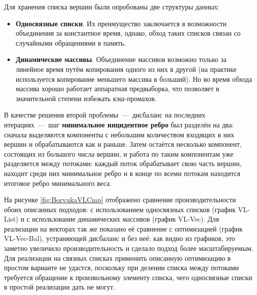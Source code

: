 \documentclass[a4paper,10pt]{extarticle}
\begin{document}
Для хранения списка вершин были опробованы две структуры данных:
\begin{itemize}
	\item \textbf{Односвязные списки}. Их преимущество заключается в возможности объединения за константное время, однако, обход таких списков связан со случайными обращениями в память.
	\item \textbf{Динамические массивы}. Объединение массивов возможно только за линейное время путём копирования одного из них в другой (на практике используется копирование меньшего массива в больший). Но во время обхода массива хорошо работает аппаратная предвыборка, что позволяет в значительной степени избежать кэш-промахов.
\end{itemize}

В качестве решения второй проблемы~---~дисбаланс на последних итерациях~---~шаг \textbf{минимальное инцидентное ребро} был разделён на два: сначала выделяются компоненты с небольшим количеством входящих в них вершин и обрабатываются как и раньше. Затем остаётся несколько компонент, состоящих из большого числа вершин, и работа по таким компонентам уже разделяется между потоками: каждый поток обрабатывает свою часть вершин, находит среди них минимальное ребро и в конце по всеми потокам находится итоговое ребро минимального веса.

На рисунке \ref{fig:BorvukaVLCmp} отображено сравнение производительности обоих описанных подходов: с использованием односвязных списков (график VL-List) и с использование динамических массивов (график VL-Vec).
Для реализации на векторах так же показано её сравнение с оптимизацией (график VL-Vec-Bal), устраняющей дисбаланс и без неё: как видно из графиков, это заметно увеличило производительность и сделало подход более масштабируемым. 
Для реализации на связных списках применить описанную оптимизацию в простом варианте не удастся, поскольку при делении списка между потоками требуется обращение к произвольному элементу списка, чего односвязные списки в простой реализации дать не могут.
\end{document}
